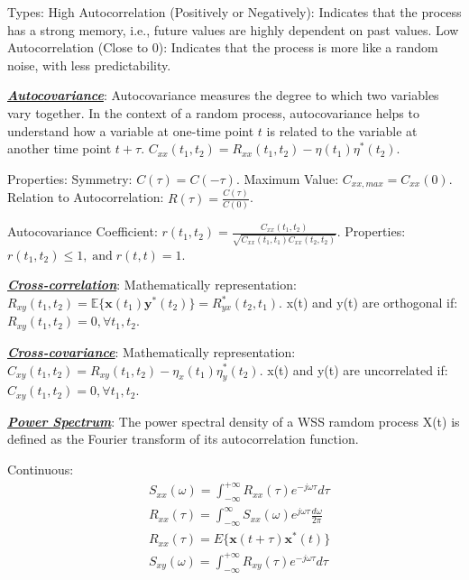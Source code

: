 \documentclass[12pt]{article}
\newcommand{\bulletPoint}[1]{\ul{\textit{\textbf{#1}}}}
\begin{document}
\begin{multicols*}{4}
Types: High Autocorrelation (Positively or Negatively):  Indicates that the process has a strong memory, i.e., future values are highly dependent on past values. Low Autocorrelation (Close to 0): Indicates that the process is more like a random noise, with less predictability.


\bulletPoint{Autocovariance}: Autocovariance measures the degree to which two variables vary together. In the context of a random process, autocovariance helps to understand how a variable at one-time point $t$ is related to the variable at another time point $t+\tau$. $C_{xx}(t_1, t_2) = R_{xx}(t_1, t_2) - \eta(t_1) \eta^*(t_2)$.

Properties: Symmetry: $C(\tau) = C(-\tau)$. Maximum Value: $C_{xx, max}=C_{xx}(0)$. Relation to Autocorrelation: $R(\tau) = \frac{C(\tau)}{C(0)}$. 

Autocovariance Coefficient: $r(t_1, t_2) = \frac{C_{xx}(t_1,t_2)}{\sqrt{C_{xx}(t_1,t_1)C_{xx}(t_2,t_2)}}$. Properties: $r(t_1,t_2)\leq 1, \; \text{and} \; r(t,t)=1$.


\bulletPoint{Cross-correlation}: Mathematically representation: $R_{xy}(t_1,t_2) = \mathbb{E}\{ \mathbf{x}(t_1) \mathbf{y}^*(t_2) \} = R^*_{yx}(t_2,t_1)$. x(t) and y(t) are orthogonal if: $R_{xy}(t_1,t_2)=0, \forall t_1,t_2$.

\bulletPoint{Cross-covariance}: Mathematically representation: $C_{xy}(t_1,t_2) = R_{xy}(t_1,t_2) - \eta_x(t_1)\eta^*_y(t_2)$. x(t) and y(t) are uncorrelated if: $C_{xy}(t_1,t_2)=0, \forall t_1,t_2$.


\bulletPoint{Power Spectrum}: The power spectral density of a WSS ramdom process X(t) is defined as the Fourier transform of its autocorrelation function.

Continuous:
\useshortskip \begin{equation*}
    \begin{split}
        & S_{xx}(\omega) = \int^{+\infty}_{-\infty}R_{xx}(\tau)e^{-j\omega\tau}d\tau \\[-4pt]
        & R_{xx}(\tau) = \int^{\infty}_{-\infty}S_{xx}(\omega)e^{j\omega \tau}\frac{d\omega}{2\pi}\\[-4pt]
        & R_{xx}(\tau) = E\{\mathbf{x}(t+\tau)\mathbf{x}^*(t)\} \\[-4pt]
        & S_{xy}(\omega) = \int^{+\infty}_{-\infty}R_{xy}(\tau)e^{-j\omega\tau}d\tau \\[-7pt]
    \end{split}
\end{equation*}


\end{multicols*}
\end{document}

